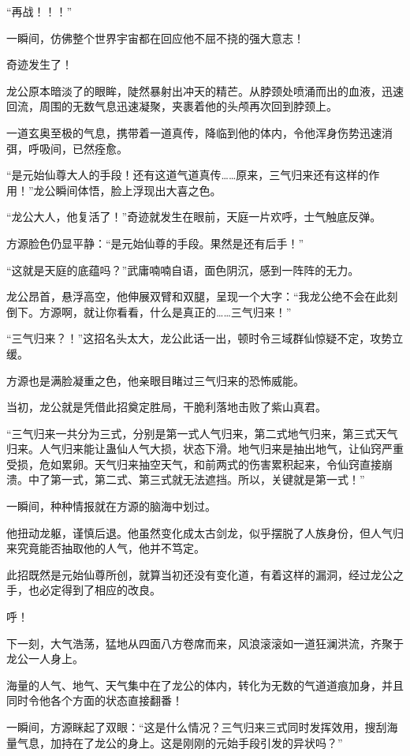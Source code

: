 \begin{this_body}
“再战！！！”

一瞬间，仿佛整个世界宇宙都在回应他不屈不挠的强大意志！

奇迹发生了！

龙公原本暗淡了的眼眸，陡然暴射出冲天的精芒。从脖颈处喷涌而出的血液，迅速回流，周围的无数气息迅速凝聚，夹裹着他的头颅再次回到脖颈上。

一道玄奥至极的气息，携带着一道真传，降临到他的体内，令他浑身伤势迅速消弭，呼吸间，已然痊愈。

“是元始仙尊大人的手段！还有这道气道真传……原来，三气归来还有这样的作用！”龙公瞬间体悟，脸上浮现出大喜之色。

“龙公大人，他复活了！”奇迹就发生在眼前，天庭一片欢呼，士气触底反弹。

方源脸色仍显平静：“是元始仙尊的手段。果然是还有后手！”

“这就是天庭的底蕴吗？”武庸喃喃自语，面色阴沉，感到一阵阵的无力。

龙公昂首，悬浮高空，他伸展双臂和双腿，呈现一个大字：“我龙公绝不会在此刻倒下。方源啊，就让你看看，什么是真正的……三气归来！”

“三气归来？！”这招名头太大，龙公此话一出，顿时令三域群仙惊疑不定，攻势立缓。

方源也是满脸凝重之色，他亲眼目睹过三气归来的恐怖威能。

当初，龙公就是凭借此招奠定胜局，干脆利落地击败了紫山真君。

“三气归来一共分为三式，分别是第一式人气归来，第二式地气归来，第三式天气归来。人气归来能让蛊仙人气大损，状态下滑。地气归来是抽出地气，让仙窍严重受损，危如累卵。天气归来抽空天气，和前两式的伤害累积起来，令仙窍直接崩溃。中了第一式，第二式、第三式就无法遮挡。所以，关键就是第一式！”

一瞬间，种种情报就在方源的脑海中划过。

他扭动龙躯，谨慎后退。他虽然变化成太古剑龙，似乎摆脱了人族身份，但人气归来究竟能否抽取他的人气，他并不笃定。

此招既然是元始仙尊所创，就算当初还没有变化道，有着这样的漏洞，经过龙公之手，也必定得到了相应的改良。

呼！

下一刻，大气浩荡，猛地从四面八方卷席而来，风浪滚滚如一道狂澜洪流，齐聚于龙公一人身上。

海量的人气、地气、天气集中在了龙公的体内，转化为无数的气道道痕加身，并且同时令他各个方面的状态直接翻番！

一瞬间，方源眯起了双眼：“这是什么情况？三气归来三式同时发挥效用，搜刮海量气息，加持在了龙公的身上。这是刚刚的元始手段引发的异状吗？”


\end{this_body}
